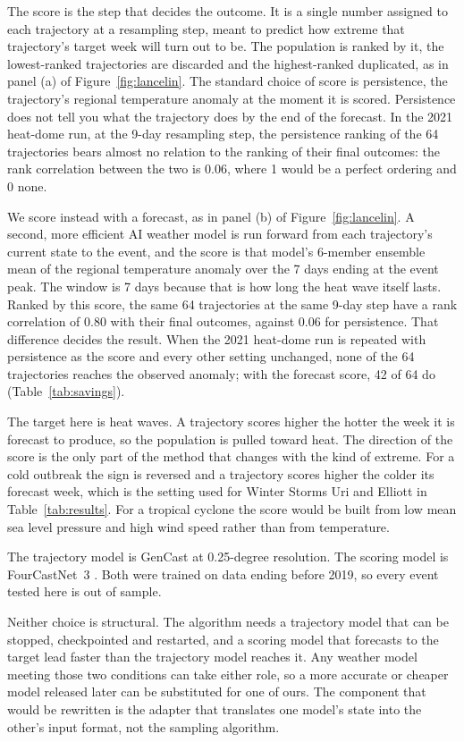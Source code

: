 \documentclass[11pt]{article}
\begin{document}
The score is the step that decides the outcome. It is a single number assigned to each
trajectory at a resampling step, meant to predict how extreme that trajectory's target week will
turn out to be. The population is ranked by it, the lowest-ranked trajectories are discarded and
the highest-ranked duplicated, as in panel (a) of Figure~\ref{fig:lancelin}. The standard choice
of score is persistence, the trajectory's regional temperature anomaly at the moment it is scored.
Persistence does not tell you what the trajectory does by the end of the forecast. In the 2021
heat-dome run, at the 9-day resampling step, the persistence ranking of the 64 trajectories bears
almost no relation to the ranking of their final outcomes: the rank correlation between the two is
0.06, where 1 would be a perfect ordering and 0 none.

We score instead with a forecast, as in panel (b) of Figure~\ref{fig:lancelin}. A second, more
efficient AI weather model is run forward from each trajectory's current state to the event, and
the score is that model's 6-member ensemble mean of the regional temperature anomaly over the 7
days ending at the event peak. The window is 7 days because that is how long the heat wave itself
lasts. Ranked by this score, the same 64 trajectories at the same 9-day step have a rank
correlation of 0.80 with their final outcomes, against 0.06 for persistence. That difference
decides the result. When the 2021 heat-dome run is repeated with persistence as the score and
every other setting unchanged, none of the 64 trajectories reaches the observed anomaly; with the
forecast score, 42 of 64 do (Table~\ref{tab:savings}).

The target here is heat waves. A trajectory scores higher the hotter the week it is forecast to
produce, so the population is pulled toward heat. The direction of the score is the only part of
the method that changes with the kind of extreme. For a cold outbreak the sign is reversed and a
trajectory scores higher the colder its forecast week, which is the setting used for Winter Storms
Uri and Elliott in Table~\ref{tab:results}. For a tropical cyclone the score would be built from
low mean sea level pressure and high wind speed rather than from temperature.

The trajectory model is GenCast \citep{price2025gencast} at 0.25-degree resolution. The scoring
model is FourCastNet~3 \citep{bonev2025fcn3}. Both were trained on data ending before 2019, so every event tested here
is out of sample.

Neither choice is structural. The algorithm needs a trajectory model that can be
stopped, checkpointed and restarted, and a scoring model that forecasts to the target lead faster
than the trajectory model reaches it. Any weather model meeting those two
conditions can take either role, so a more accurate or cheaper model released later can be
substituted for one of ours. The component that would be rewritten is the adapter that translates
one model's state into the other's input format, not the sampling algorithm.
\end{document}
